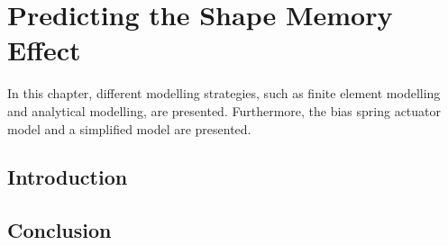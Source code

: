 
\chapter{Predicting the Shape Memory Effect}
In this chapter, different modelling strategies, such as finite element modelling and analytical modelling, are presented. Furthermore, the bias spring actuator model and a simplified model are presented.
\section{Introduction}
\section{Conclusion}
